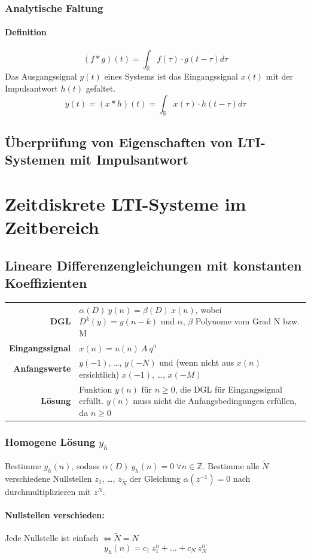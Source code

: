 \documentclass[10pt,a4paper]{article}
\newcommand{\fancythumb}[2]{
	\addthumb{#1}{\large\sffamily\textbf{\space\space#1\vspace{5pt}}}{white}{#2}
}
\begin{document}
\subsubsection*{Analytische Faltung}
\paragraph*{Definition}
\[ (f \ast g)(t)=\int_\mathbb{R}f(\tau)\cdot g(t-\tau) d\tau \]
Das Ausgangssignal $y(t)$ eines Systems ist das Eingangssignal $x(t)$ mit der Impulsantwort $h(t)$ gefaltet.
\[ y(t) = (x \ast h)(t)=\int_\mathbb{R}x(\tau)\cdot h(t-\tau) d\tau\]
\subsection*{Überprüfung von Eigenschaften von LTI-Systemen mit Impulsantwort}
\newpage


\section*{Zeitdiskrete LTI-Systeme im Zeitbereich}
\fancythumb{ZD-t}{magenta}
\subsection*{Lineare Differenzengleichungen mit konstanten Koeffizienten}
\begin{tabular}{r p{12cm}}
	\textbf{DGL} & $\alpha(D) ~ y(n) = \beta(D) ~ x(n)$, wobei $D^k(y) = y(n-k)$ und $\alpha$, $\beta$ Polynome vom Grad N bzw. M \\
	\textbf{Eingangssignal} & $x(n) = u(n) ~ A ~ q^n$ \\
	\textbf{Anfangswerte} & $y(-1)$, …, $y(-N)$ und (wenn nicht aus $x(n)$ ersichtlich) $x(-1)$, …, $x(-M)$ \\
	\textbf{Lösung} & Funktion $y(n)$ für $n \geq 0$, die DGL für Eingangssignal erfüllt. $y(n)$ muss nicht die Anfangsbedingungen erfüllen, da $n \geq 0$
\end{tabular}

\subsubsection*{Homogene Lösung $y_h$}
Bestimme $y_h(n)$, sodass $\alpha(D) ~ y_h(n) = 0 ~ \forall n \in \mathbb Z$. Bestimme alle $\tilde N$ verschiedene Nullstellen $z_1$, …, $z_{\tilde N}$ der Gleichung $\alpha(z^{-1}) = 0$ nach durchmultiplizieren mit $z^N$.

\paragraph{Nullstellen verschieden:} Jede Nullstelle ist einfach $\Leftrightarrow \tilde N = N$
\[
	y_h(n) = c_1 ~ z_1^n + … + c_N ~ z_N^n
\]
\end{document}
